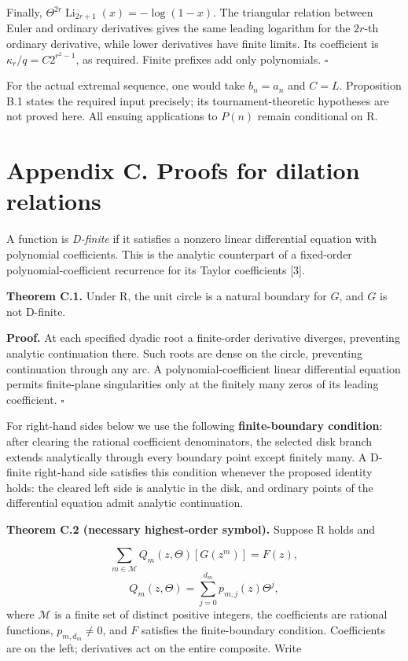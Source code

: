 \documentclass[11pt,a4paper]{article}
\begin{document}
Finally, $\Theta^{2r}\operatorname{Li}_{2r+1}(x)=-\log(1-x)$. The triangular relation between Euler and ordinary derivatives gives the same leading logarithm for the $2r$-th ordinary derivative, while lower derivatives have finite limits. Its coefficient is $\kappa_r/q=C2^{r^2-1}$, as required. Finite prefixes add only polynomials. $\square$

For the actual extremal sequence, one would take $b_n=a_n$ and $C=L$. Proposition B.1 states the required input precisely; its tournament-theoretic hypotheses are not proved here. All ensuing applications to $P(n)$ remain conditional on R.

\section*{Appendix C. Proofs for dilation relations}
A function is \emph{D-finite} if it satisfies a nonzero linear differential equation with polynomial coefficients. This is the analytic counterpart of a fixed-order polynomial-coefficient recurrence for its Taylor coefficients [3].

\textbf{Theorem C.1.} Under R, the unit circle is a natural boundary for $G$, and $G$ is not D-finite.

\textbf{Proof.} At each specified dyadic root a finite-order derivative diverges, preventing analytic continuation there. Such roots are dense on the circle, preventing continuation through any arc. A polynomial-coefficient linear differential equation permits finite-plane singularities only at the finitely many zeros of its leading coefficient. $\square$

For right-hand sides below we use the following \textbf{finite-boundary condition}: after clearing the rational coefficient denominators, the selected disk branch extends analytically through every boundary point except finitely many. A D-finite right-hand side satisfies this condition whenever the proposed identity holds: the cleared left side is analytic in the disk, and ordinary points of the differential equation admit analytic continuation.

\textbf{Theorem C.2 (necessary highest-order symbol).} Suppose R holds and

\[
\sum_{m\in\mathcal M}Q_m(z,\Theta)[G(z^m)]=F(z),
\]
\[
Q_m(z,\Theta)=\sum_{j=0}^{d_m}p_{m,j}(z)\Theta^j,
\]
where $\mathcal M$ is a finite set of distinct positive integers, the coefficients are rational functions, $p_{m,d_m}\ne0$, and $F$ satisfies the finite-boundary condition. Coefficients are on the left; derivatives act on the entire composite. Write
\end{document}
